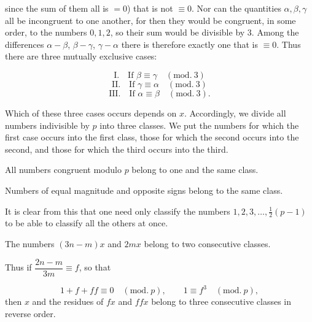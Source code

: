 since the sum of them all is $=0$) that is not $\equiv 0$. Nor can the quantities
$\alpha, \beta, \gamma$ all be incongruent to one another, for then they would be congruent,
in some order, to the numbers $0, 1, 2$, so their sum would be divisible by
$3$. Among the differences $\alpha-\beta$,
$\beta-\gamma$, $\gamma-\alpha$ there is therefore exactly one that is
$\equiv 0$. Thus there are three mutually exclusive cases:

\[
\text{I.} \quad \text{If } \beta \equiv \gamma \quad(\mathrm{mod.}\ 3)
\]
\[
\text{II.} \quad \text{If } \gamma \equiv \alpha \quad(\mathrm{mod.}\ 3)
\]
\[
\text{III.} \quad \text{If } \alpha \equiv \beta \quad(\mathrm{mod.}\ 3).
\]

Which of these three cases occurs depends on $x$. Accordingly, we divide
all numbers indivisible by $p$ into three classes. We put the numbers for
which the first case occurs into the first class, those for which the second
occurs into the second, and those for which the third occurs into the third.

 All numbers congruent modulo $p$ belong to
one and the same class.

 Numbers of equal magnitude and opposite signs
belong to the same class.

It is clear from this that one need only classify the numbers $1, 2, 3, \ldots,
\frac{1}{2}(p-1)$
to be able to classify all the others at once.

 The numbers $(3n-m)x$ and $2mx$ belong to two
consecutive classes.

 Thus if $\dfrac{2n-m}{3m} \equiv f$, so that

\[
1+f+ff \equiv 0 \quad(\mathrm{mod.}\ p), \qquad 1 \equiv f^3 \quad(\mathrm{mod.}\ p),
\]
\noindent then $x$ and the residues of $fx$ and $ffx$ belong to
three consecutive classes in reverse order.

